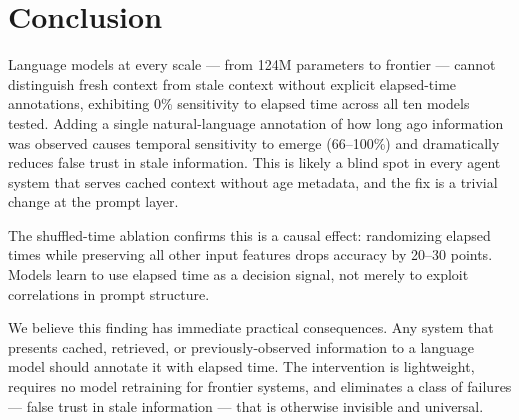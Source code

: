 \documentclass[11pt,a4paper]{article}
\begin{document}
\section{Conclusion}

Language models at every scale --- from 124M parameters to frontier --- cannot distinguish fresh context from stale context without explicit elapsed-time annotations, exhibiting 0\% sensitivity to elapsed time across all ten models tested.
Adding a single natural-language annotation of how long ago information was observed causes temporal sensitivity to emerge (66--100\%) and dramatically reduces false trust in stale information.
This is likely a blind spot in every agent system that serves cached context without age metadata, and the fix is a trivial change at the prompt layer.

The shuffled-time ablation confirms this is a causal effect: randomizing elapsed times while preserving all other input features drops accuracy by 20--30 points.
Models learn to use elapsed time as a decision signal, not merely to exploit correlations in prompt structure.

We believe this finding has immediate practical consequences.
Any system that presents cached, retrieved, or previously-observed information to a language model should annotate it with elapsed time.
The intervention is lightweight, requires no model retraining for frontier systems, and eliminates a class of failures --- false trust in stale information --- that is otherwise invisible and universal.



\end{document}
